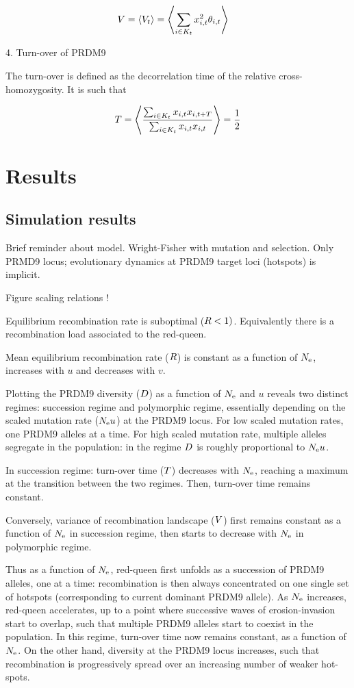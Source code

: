 \documentclass{article}
\begin{document}
\begin{align}
     V &= \left< V_{t} \right> = \left< \sum_{i \in K_{t}} x_{i,t}^2 \theta _{i,t} \right> 
\end{align}

4. Turn-over of PRDM9

The turn-over is defined as the decorrelation time of the relative cross-homozygosity.
It is such that 

\begin{align}
   T = \left< \dfrac{\sum_{i \in K_{t}} x_{i,t} x_{i,t+T}}{\sum_{i \in K_{t}} x_{i,t} x_{i,t}}   \right>  =  \dfrac{1}{2}
\end{align}

\section*{Results}
\subsection*{Simulation results} 

Brief reminder about model. Wright-Fisher with mutation and selection. Only PRMD9 locus; evolutionary dynamics at PRDM9 target loci (hotspots) is implicit.

Figure scaling relations !

Equilibrium recombination rate is suboptimal ($R < 1)$. Equivalently there is a recombination load associated to the red-queen.

Mean equilibrium recombination rate ($R$) is constant as a function of $N_\mathrm{e}$, increases with $u$ and decreases with $v$.

Plotting the PRDM9 diversity ($D$) as a function of $N_\mathrm{e}$ and $u$ reveals two distinct regimes: succession regime and polymorphic regime, essentially depending on the scaled mutation rate ($N_\mathrm{e} u$) at the PRDM9 locus. For low scaled mutation rates, one PRDM9 alleles at a time. For high scaled mutation rate, multiple alleles segregate in the population: in the regime $D$ is roughly proportional to $N_\mathrm{e} u$.

In succession regime: turn-over time ($T$) decreases with $N_\mathrm{e}$, reaching a maximum at the transition between the two regimes. Then, turn-over time remains constant.

Conversely, variance of recombination landscape ($V$) first remains constant as a function of $N_\mathrm{e}$ in succession regime, then starts to decrease with $N_\mathrm{e}$ in polymorphic regime.

Thus as a function of $N_\mathrm{e}$, red-queen first unfolds as a succession of PRDM9 alleles, one at a time: recombination is then always concentrated on one single set of hotspots (corresponding to current dominant PRDM9 allele). As $N_\mathrm{e}$ increases, red-queen accelerates, up to a point where successive waves of erosion-invasion start to overlap, such that multiple PRDM9 alleles start to coexist in the population. In this regime, turn-over time now remains constant, as a function of $N_\mathrm{e}$. On the other hand, diversity at the PRDM9 locus increases, such that recombination is progressively spread over an increasing number of weaker hot-spots.
\end{document}
